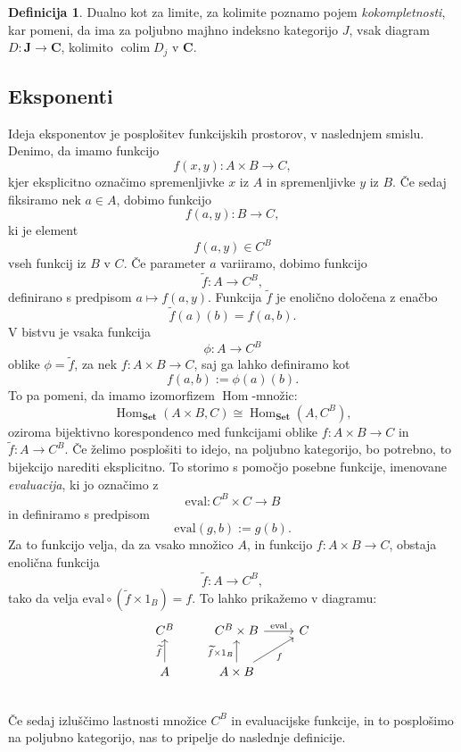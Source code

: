 \documentclass[12pt,a4paper]{book}
\theoremstyle{definition}
\newtheorem{definicija}{Definicija}[chapter]
\theoremstyle{plain}
\theoremstyle{definition}
\theoremstyle{remark}
\newcommand{\cat}[1]{\textbf{#1}}
\DeclareMathOperator{\Hom}{Hom}
\DeclareMathOperator{\colim}{colim}
\begin{document}
\begin{definicija}
Dualno kot za limite, za kolimite poznamo pojem \emph{kokompletnosti}, kar pomeni, da ima za poljubno majhno indeksno kategorijo $J$, vsak diagram $D : \cat{J} \to \cat{C}$, kolimito $\colim D_j$ v $\cat{C}$.
\end{definicija}

\subsection{Eksponenti}

Ideja eksponentov je posplošitev funkcijskih prostorov, v naslednjem smislu. Denimo, da imamo funkcijo
$$f(x,y) : A \times B \to C,$$
kjer eksplicitno označimo spremenljivke $x$ iz $A$ in spremenljivke $y$ iz $B$. Če sedaj fiksiramo nek $a \in A$, dobimo funkcijo
$$f(a,y): B \to C,$$
ki je element
$$f(a,y) \in C^B$$
vseh funkcij iz $B$ v $C$. Če parameter $a$ variiramo, dobimo funkcijo
$$\widetilde{f} : A \to C^B,$$
definirano s predpisom $a \mapsto f(a,y)$. Funkcija $\widetilde{f}$ je enolično določena z enačbo
$$\widetilde{f}(a)(b) = f(a,b).$$
V bistvu je vsaka funkcija 
$$\phi : A \to C^B$$
oblike $\phi = \widetilde{f}$, za nek $f : A \times B \to C$, saj ga lahko definiramo kot
$$f(a,b) := \phi(a)(b).$$
To pa pomeni, da imamo izomorfizem $\Hom$-množic:
$$\Hom_{\cat{Set}}(A \times B, C) \cong \Hom_{\cat{Set}}(A, C^B),$$
oziroma bijektivno korespondenco med funkcijami oblike $f : A\times B \to C$ in $\widetilde{f} : A \to C^B$. Če želimo posplošiti to idejo, na poljubno kategorijo, bo potrebno, to bijekcijo narediti eksplicitno. To storimo s pomočjo posebne funkcije, imenovane \emph{evaluacija}, ki jo označimo z
$$\mathrm{eval} : C^B \times C \to B$$
in definiramo s predpisom 
$$\mathrm{eval}(g,b) := g(b).$$
Za to funkcijo velja, da za vsako množico $A$, in funkcijo $f : A \times B \to C$, obstaja enolična funkcija
$$\widetilde{f} : A \to C^B,$$
tako da velja $\mathrm{eval} \circ (\widetilde{f} \times 1_B) = f$. To lahko prikažemo v diagramu:
$$\begin{tikzcd}
C^B &  C^B \times B \ar[r, "\mathrm{eval}"] & C \\
A \ar[u, "\widetilde{f}"] &  A \times B \ar[u, "\widetilde{f} \times 1_B"] \ar[ur, "f"'] & \\
\end{tikzcd}$$
Če sedaj izluščimo lastnosti množice $C^B$ in evaluacijske funkcije, in to posplošimo na poljubno kategorijo, nas to pripelje do naslednje definicije.
\end{document}
